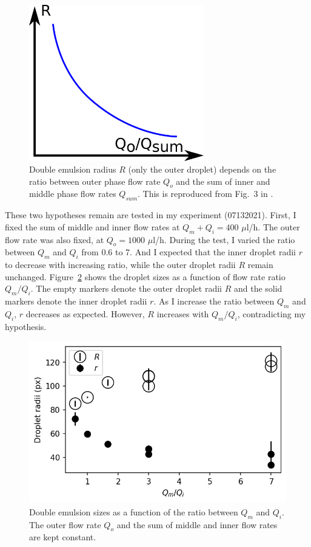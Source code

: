 \documentclass[onecolumn,aps, pre,amsmath,amssymb,longbibliography,12pt]{revtex4-2}
\begin{document}
\begin{figure}[h]
  \includegraphics[width=3in]{size-outerflow.png}
  \caption{Double emulsion radius $R$ (only the outer droplet) depends on the ratio between outer phase flow rate $Q_o$ and the sum of inner and middle phase flow rates $Q_{sum}$.
  This is reproduced from Fig.~3 in \cite{Utada2005}.}
  \label{fig:size-outerflow}
\end{figure}

These two hypotheses remain are tested in my experiment (07132021).
First, I fixed the sum of middle and inner flow rates at $Q_m+Q_i=400$ $\mu$l/h.
The outer flow rate was also fixed, at $Q_o=1000$ $\mu$l/h.
During the test, I varied the ratio between $Q_m$ and $Q_i$ from 0.6 to 7.
And I expected that the inner droplet radii $r$ to decrease with increasing ratio, while the outer droplet radii $R$ remain unchanged.
Figure~\ref{fig:fix-mi-sum} shows the droplet sizes as a function of flow rate ratio $Q_m/Q_i$.
The empty markers denote the outer droplet radii $R$ and the solid markers denote the inner droplet radii $r$.
As I increase the ratio between $Q_m$ and $Q_i$, $r$ decreases as expected.
However, $R$ increases with $Q_m/Q_i$, contradicting my hypothesis.

\begin{figure}[h]
  \includegraphics{fix-mi-sum.png}
  \caption{Double emulsion sizes as a function of the ratio between $Q_m$ and $Q_i$.
  The outer flow rate $Q_o$ and the sum of middle and inner flow rates are kept constant.}
  \label{fig:fix-mi-sum}
\end{figure}
\end{document}

